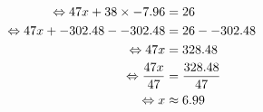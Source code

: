 \documentclass{article}%
\begin{document}
\ \\%
\vspace{5mm}%
\newline%
\begin{align*}%
\ \Leftrightarrow  47x + 38 \times -7.96 &= 26 \\%
\vspace{5mm}%
\newline%
\ \Leftrightarrow  47x + -302.48 --302.48 &= 26 - -302.48 \\%
\vspace{5mm}%
\newline%
\ \Leftrightarrow  47x  &= 328.48 \\%
\vspace{5mm}%
\newline%
\ \Leftrightarrow  \frac{47x}{47} &= \frac{328.48}{47}\\%
\vspace{5mm}%
\newline%
\ \Leftrightarrow  x &\approx 6.99 \\%
\vspace{5mm}%
\newline%
\end{align*}

%
\end{document}
